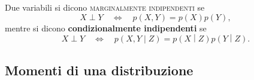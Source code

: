 \documentclass[10pt]{article}
\newcommand{\im}[1]{\textsc{#1}}
\newcommand{\cond}{\middle|}
\newcommand{\pare}[1]{
	\ensuremath{\left(#1\right)}
}
\theoremstyle{definition}
\theoremstyle{definition}
\begin{document}
Due variabili si dicono \im{marginalmente indipendenti} se
\begin{equation}
X\perp Y \quad\Longleftrightarrow\quad p\pare{X, Y} = p\pare{X} p\pare{Y},
\end{equation}
mentre si dicono \textbf{condizionalmente indipendenti} se
\begin{equation}
X\perp Y \quad\Longleftrightarrow\quad p\pare{X, Y\cond Z} = p\pare{X\cond Z} p\pare{Y\cond Z}. 
\end{equation}

\subsection{Momenti di una distribuzione}
\end{document}
